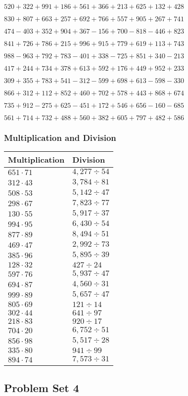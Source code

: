 \(520 + 322 + 991 + 186 + 561 + 366 + 213 + 625 + 132 + 428\)

\(830 + 807 + 663 + 257 + 692 + 766 + 557 + 905 + 267 + 741\)

\(474 - 403 + 352 + 904 + 367 - 156 + 700 - 818 - 446 + 823\)

\(841 + 726 + 786 + 215 + 996 + 915 + 779 + 619 + 113 + 743\)

\(988 - 963 + 792 + 783 - 401 + 338 - 725 + 851 + 340 - 213\)

\(417 + 244 + 734 + 378 + 613 + 592 + 176 + 449 + 952 + 233\)

\(309 + 355 + 783 + 541 - 312 - 599 + 698 + 613 - 598 - 330\)

\(866 + 312 + 112 + 852 + 460 + 702 + 578 + 443 + 868 + 674\)

\(735 + 912 - 275 + 625 - 451 + 172 + 546 + 656 - 160 - 685\)

\(561 + 714 + 732 + 488 + 560 + 382 + 605 + 797 + 482 + 586\)

\hypertarget{multiplication-and-division-103}{%
\subsubsection{Multiplication and
Division}\label{multiplication-and-division-103}}

\begin{longtable}[]{@{}ll@{}}
\toprule
Multiplication & Division\tabularnewline
\midrule
\endhead
\(651 \cdot 71\) & \(4,277÷54\)\tabularnewline
\(312 \cdot 43\) & \(3,784÷81\)\tabularnewline
\(508 \cdot 53\) & \(5,142÷47\)\tabularnewline
\(298 \cdot 67\) & \(7,823÷77\)\tabularnewline
\(130 \cdot 55\) & \(5,917÷37\)\tabularnewline
\(994 \cdot 95\) & \(6,430÷54\)\tabularnewline
\(877 \cdot 89\) & \(8,494÷51\)\tabularnewline
\(469 \cdot 47\) & \(2,992÷73\)\tabularnewline
\(385 \cdot 96\) & \(5,895÷39\)\tabularnewline
\(128 \cdot 32\) & \(427÷24\)\tabularnewline
\(597 \cdot 76\) & \(5,937÷47\)\tabularnewline
\(694 \cdot 87\) & \(4,560÷31\)\tabularnewline
\(999 \cdot 89\) & \(5,657÷47\)\tabularnewline
\(805 \cdot 69\) & \(121÷14\)\tabularnewline
\(302 \cdot 44\) & \(641÷97\)\tabularnewline
\(218 \cdot 83\) & \(920÷17\)\tabularnewline
\(704 \cdot 20\) & \(6,752÷51\)\tabularnewline
\(856 \cdot 98\) & \(5,517÷28\)\tabularnewline
\(335 \cdot 80\) & \(941÷99\)\tabularnewline
\(894 \cdot 74\) & \(7,573÷31\)\tabularnewline
\bottomrule
\end{longtable}

\hypertarget{problem-set-4-2}{%
\subsection{Problem Set 4}\label{problem-set-4-2}}

